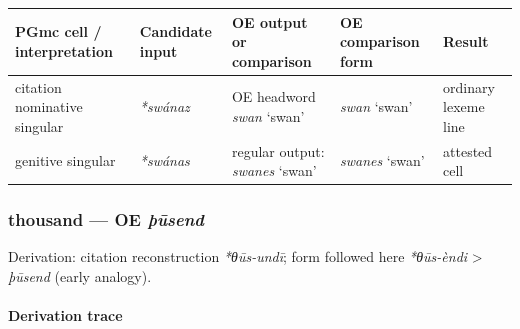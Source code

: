 \documentclass[
  british,
  a4paper,
]{article}
\newcounter{none} %
\begin{document}
{\def\LTcaptype{none} %
\begin{longtable}[]{@{}
  >{\raggedright\arraybackslash}p{}
  >{\raggedright\arraybackslash}p{}
  >{\raggedright\arraybackslash}p{}
  >{\raggedright\arraybackslash}p{}
  >{\raggedright\arraybackslash}p{}@{}}
\toprule\noalign{}
\begin{minipage}[b]{\linewidth}\raggedright
PGmc cell / interpretation
\end{minipage} & \begin{minipage}[b]{\linewidth}\raggedright
Candidate input
\end{minipage} & \begin{minipage}[b]{\linewidth}\raggedright
OE output or comparison
\end{minipage} & \begin{minipage}[b]{\linewidth}\raggedright
OE comparison form
\end{minipage} & \begin{minipage}[b]{\linewidth}\raggedright
Result
\end{minipage} \\
\midrule\noalign{}
\endhead
\bottomrule\noalign{}
\endlastfoot
citation nominative singular & {\emph{*swánaz}} & OE headword
{\emph{swan}} `swan' & {\emph{swan}} `swan' & ordinary lexeme line \\
genitive singular & {\emph{*swánas}} & regular output: {\emph{swanes}}
`swan' & {\emph{swanes}} `swan' & attested cell \\
\end{longtable}
}

\subsubsection{\texorpdfstring{thousand --- OE
\emph{þūsend}}{thousand --- OE þūsend}}\label{thousand-oe-uxfeux16bsend}

Derivation: citation reconstruction \emph{*θūs-undī}; form followed here
\emph{*θūs-èndi} \textgreater{} \emph{þūsend} (early analogy).

\paragraph{Derivation trace}\label{derivation-trace-138}
\end{document}
